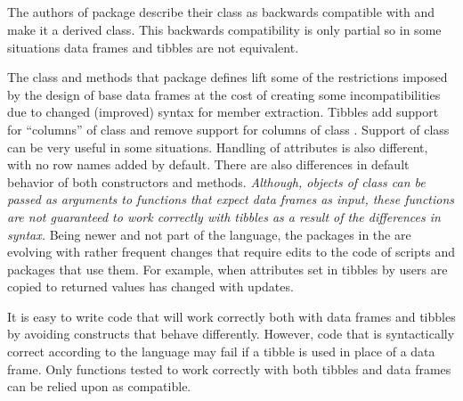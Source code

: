\documentclass[krantz2]{krantz}\usepackage{knitr}
\begin{document}
\subsection{}\label{sec:data:tibble}

The authors of package  describe their  class as backwards compatible with  and make it a derived class. This backwards compatibility is only partial so in some situations data frames and tibbles are not equivalent.

The class and methods that package  defines lift some of the restrictions imposed by the design of base \Rlang data frames at the cost of creating some incompatibilities due to changed (improved) syntax for member extraction. Tibbles add support for ``columns'' of class  and remove support for columns of class . Support  of class  can be very useful in some situations. Handling of attributes is also different, with no row names added by default. There are also differences in default behavior of both constructors and methods. \emph{Although, objects of class  can be passed as arguments to functions that expect data frames as input, these functions are not guaranteed to work correctly with tibbles as a result of the differences in syntax.} Being newer and not part of the \Rlang language, the packages in the  are evolving with rather frequent changes that require edits to the code of scripts and packages that use them. For example, when attributes set in tibbles by users are copied to returned values has changed with updates.

\begin{warningbox}
It is easy to write code that will work correctly both with data frames and tibbles by avoiding constructs that behave differently. However, code that is syntactically correct according to the \Rlang language may fail if a tibble is used in place of a data frame. Only functions tested to work correctly with both tibbles and data frames can be relied upon as compatible.
\end{warningbox}
\end{document}
